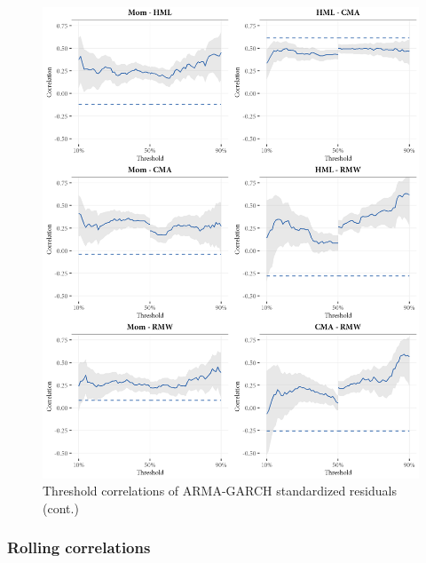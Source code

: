 \begin{figure}[p]
  \ContinuedFloat
  \centering
  \includegraphics[scale=1]{graphics/threshold2.png}
  \footnotesize
  \caption{Threshold correlations of ARMA-GARCH standardized residuals (cont.)}
\end{figure}

\subsubsection{Rolling correlations}

